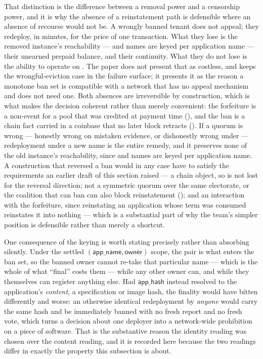 \begin{property}
That distinction is the difference between a removal power and a censorship power, and it is why the
absence of a reinstatement path is defensible where an absence of recourse would not be. A wrongly
banned tenant does not appeal; they redeploy, in minutes, for the price of one transaction. What they
lose is the removed instance's reachability --- \FDM{} and \PDNS{} names are keyed per application
name --- their unearned prepaid balance, and their continuity. What they do not lose is the ability
to operate on \Flux{}. The paper does not present that as costless, and  keeps
the wrongful-eviction case in the failure surface; it presents it as the reason a monotone ban set is
compatible with a network that has no appeal mechanism and does not need one. Both absences are
irreversible by construction, which is what makes the decision coherent rather than merely
convenient: the forfeiture is a non-event for a pool that was credited at payment time
(), and the ban is a chain fact carried in a coinbase that no later block
retracts (). If a quorum is wrong --- honestly wrong on mistaken evidence, or
dishonestly wrong under  --- redeployment under a new name is the entire
remedy, and it preserves none of the old instance's reachability, since \FDM{} and \PDNS{} names are
keyed per application name. A construction that reversed a ban would in any case have to satisfy the
requirements an earlier draft of this section raised --- a chain object, so
 is not lost for the reversal direction; not a symmetric quorum over the
same electorate, or the coalition that can ban can also block reinstatement
(); and an interaction with the forfeiture, since reinstating an application
whose term was consumed reinstates it into nothing --- which is a substantial part of why the
team's simpler position is defensible rather than merely a shortcut.

One consequence of the keying is worth stating precisely rather than absorbing silently. Under the
settled $(\mathsf{app\_name}, \mathsf{owner})$ scope, the pair is what enters the ban set, so the
banned owner cannot re-take that particular name --- which is the whole of what ``final'' costs them
--- while any other owner can, and while they themselves can register anything else. Had
$\mathsf{app\_hash}$ instead resolved to the application's \emph{content}, a specification or image
hash, the finality would have bitten differently and worse: an otherwise identical redeployment by
\emph{anyone} would carry the same hash and be immediately banned with no fresh report and no fresh
vote, which turns a decision about one deployer into a network-wide prohibition on a piece of
software. That is the substantive reason the identity reading was chosen over the content reading,
and it is recorded here because the two readings differ in exactly the property this subsection is
about.
\end{property}

